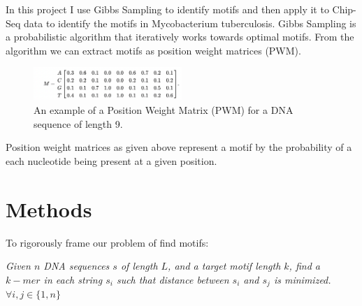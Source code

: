 \documentclass[12pt]{scrartcl} %
\begin{document}
In this project I use Gibbs Sampling to identify motifs and then apply it to Chip-Seq data to identify the motifs in Mycobacterium tuberculosis.
Gibbs Sampling is a probabilistic algorithm that iteratively works towards optimal motifs. From the algorithm we can extract motifs as 
position weight matrices (PWM).

\begin{figure}
\includegraphics[width=0.5\textwidth]{Pictures/PWM_Example.png}
\caption{ An example of a Position Weight Matrix (PWM) \newline for a DNA sequence of length 9. }
\end{figure}

Position weight matrices as given above represent a motif by the probability of a each nucleotide being present at a given position. 

\section{Methods}
To rigorously frame our problem of find motifs: 

\emph{Given $n$ DNA sequences $s$ of length $L$, and a target 
motif length $k$, find a $k-mer$ in each string $s_i$ such that distance between $s_i$ and $s_j$ is minimized. $\forall i , j \in \{1,n\}$}
\end{document}
